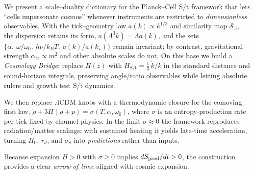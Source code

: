 
We present a scale--duality dictionary for the Planck--Cell S/t framework that lets ``cells impersonate cosmos'' whenever instruments are restricted to \emph{dimensionless} observables. With the tick--geometry law $a(k)\propto k^{1/3}$ and similarity map $\mathcal S_\Lambda$, the dispersion retains its form, $a(\Lambda^3k)=\Lambda a(k)$, and the sets $\{\alpha,\ \omega/\omega_0,\ h\nu/k_BT,\ a(k)/a(k_\star)\}$ remain invariant; by contrast, gravitational strength $\alpha_G\propto m^2$ and other absolute scales do not. On this base we build a \emph{Cosmology Bridge}: replace $H(z)$ with $H_{\text{S/t}}=\tfrac13\,\dot k/k$ in the standard distance and sound-horizon integrals, preserving angle/ratio observables while letting absolute rulers and growth test S/t dynamics.


We then replace $\Lambda$CDM knobs with a thermodynamic closure for the comoving first law, $\dot\rho+3H(\rho+p)=\sigma(T,\alpha,\omega_0)$, where $\sigma$ is an entropy-production rate per tick fixed by channel physics. In the limit $\sigma\approx 0$ the framework reproduces radiation/matter scalings; with sustained heating it yields late-time acceleration, turning $H_0$, $r_d$, and $\sigma_8$ into \emph{predictions} rather than inputs.

\vspace{0.5\baselineskip}

Because expansion $H>0$ with $\sigma\ge 0$ implies $dS_{\rm prod}/dt>0$, the construction provides a clear \emph{arrow of time} aligned with cosmic expansion.
